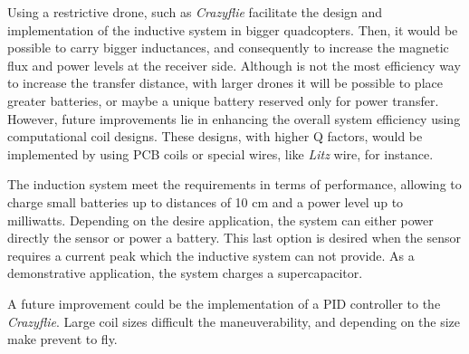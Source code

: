 Using a restrictive drone, such as \textit{Crazyflie} facilitate the design and implementation of the inductive system in bigger quadcopters. Then, it would be possible to carry bigger inductances, and consequently to increase the magnetic flux and power levels at the receiver side. Although is not the most efficiency way to increase the transfer distance, with larger drones it will be possible to place greater batteries, or maybe a unique battery reserved only for power transfer. However, future improvements lie in enhancing the overall system efficiency using computational coil designs. These designs, with higher Q factors, would be implemented by using PCB coils or special wires, like \textit{Litz} wire, for instance.

The induction system meet the requirements in terms of performance, allowing to charge small batteries up to distances of 10 cm and a power level up to milliwatts. Depending on the desire application, the system can either power directly the sensor or power a battery. This last option is desired when the sensor requires a current peak which the inductive system can not provide. As a demonstrative application, the system charges a supercapacitor. %

A future improvement could be the implementation of a PID controller to the \textit{Crazyflie}. Large coil sizes difficult the maneuverability, and depending on the size make prevent to fly.